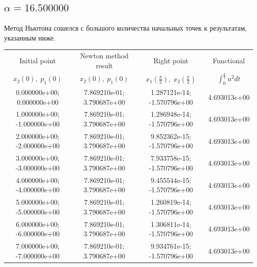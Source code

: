 \documentclass[titlepage]{article}
\def\l{\left}
\def\r{\right}
\begin{document}
\subsection{$\alpha = 16.500000$} 
Метод Ньютона сошелся с большого количества начальных точек к результатам, указанным ниже. \\ 
\begin{tabular}{ | c | c | c | c |} 
\hline 
Initial point  & Newton method result & Right point & Functional 
 \\ $x_2(0), \; p_1(0)$ & $x_2(0), \; p_1(0)$ & $x_1\l(\frac{\pi}{2}\r), \; x_2\l(\frac{\pi}{2}\r)$ & $\int_{0}^{\frac{\pi}{2}}u^2dt$  \\ \hline 
0.000000e+00; 0.000000e+00 & 7.869210e-01; 3.790687e+00 & 1.287121e-14; -1.570796e+00 & 4.693013e+00 \\ \hline 
1.000000e+00; -1.000000e+00 & 7.869210e-01; 3.790687e+00 & 1.286948e-14; -1.570796e+00 & 4.693013e+00 \\ \hline 
2.000000e+00; -2.000000e+00 & 7.869210e-01; 3.790687e+00 & 9.852362e-15; -1.570796e+00 & 4.693013e+00 \\ \hline 
3.000000e+00; -3.000000e+00 & 7.869210e-01; 3.790687e+00 & 7.933758e-15; -1.570796e+00 & 4.693013e+00 \\ \hline 
4.000000e+00; -4.000000e+00 & 7.869210e-01; 3.790687e+00 & 9.455544e-15; -1.570796e+00 & 4.693013e+00 \\ \hline 
5.000000e+00; -5.000000e+00 & 7.869210e-01; 3.790687e+00 & 1.260819e-14; -1.570796e+00 & 4.693013e+00 \\ \hline 
6.000000e+00; -6.000000e+00 & 7.869210e-01; 3.790687e+00 & 1.306811e-14; -1.570796e+00 & 4.693013e+00 \\ \hline 
7.000000e+00; -7.000000e+00 & 7.869210e-01; 3.790687e+00 & 9.934761e-15; -1.570796e+00 & 4.693013e+00 \\ \hline 
\end{tabular} 
\end{document}
